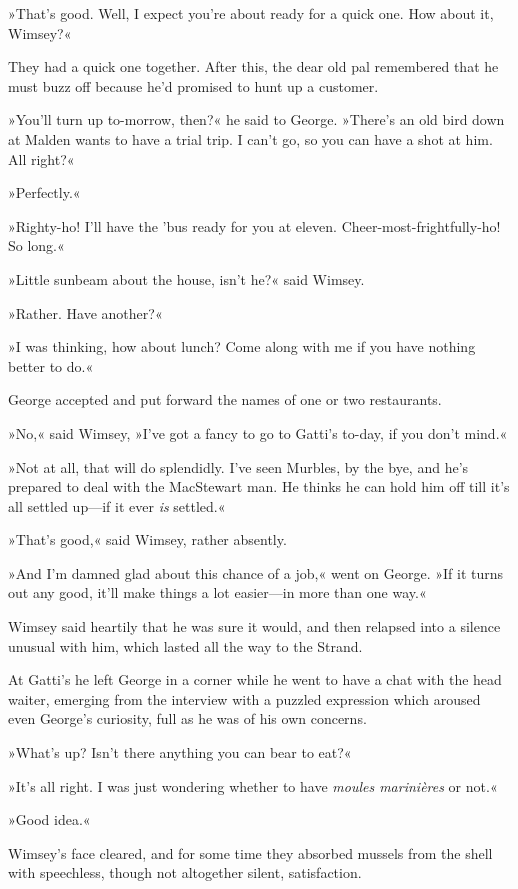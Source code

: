 »That's good. Well, I expect you're about ready for a quick one. How about it, Wimsey?«

They had a quick one together. After this, the dear old pal remembered that he must buzz off because he'd promised to hunt up a customer.

»You'll turn up to-morrow, then?« he said to George. »There's an old bird down at Malden wants to have a trial trip. I can't go, so you can have a shot at him. All right?«

»Perfectly.«

»Righty-ho! I'll have the 'bus ready for you at eleven. Cheer-most-frightfully-ho! So long.«

»Little sunbeam about the house, isn't he?« said Wimsey.

»Rather. Have another?«

»I was thinking, how about lunch? Come along with me if you have nothing better to do.«

George accepted and put forward the names of one or two restaurants.

»No,« said Wimsey, »I've got a fancy to go to Gatti's to-day, if you don't mind.«

»Not at all, that will do splendidly. I've seen Murbles, by the bye, and he's prepared to deal with the MacStewart man. He thinks he can hold him off till it's all settled up\allowbreak---\allowbreak if it ever \textit{is} settled.«

»That's good,« said Wimsey, rather absently.

»And I'm damned glad about this chance of a job,« went on George. »If it turns out any good, it'll make things a lot easier\allowbreak---\allowbreak in more than one way.«

Wimsey said heartily that he was sure it would, and then relapsed into a silence unusual with him, which lasted all the way to the Strand.

At Gatti's he left George in a corner while he went to have a chat with the head waiter, emerging from the interview with a puzzled expression which aroused even George's curiosity, full as he was of his own concerns.

»What's up? Isn't there anything you can bear to eat?«

»It's all right. I was just wondering whether to have \textit{moules marinières} or not.«

»Good idea.«

Wimsey's face cleared, and for some time they absorbed mussels from the shell with speechless, though not altogether silent, satisfaction.

